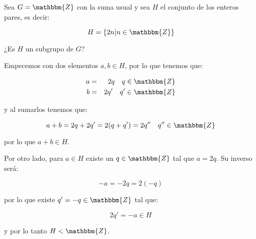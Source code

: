         \begin{ejemplo}
            Sea $G = \mathbbm{Z}$ con la suma usual y sea $H$ el conjunto de los enteros pares, es decir:

            \begin{equation*}
                H = \left\{ 2n | n \in \mathbbm{Z} \right\}
            \end{equation*}

            ¿Es $H$ un subgrupo de $G$?

            Empecemos con dos elementos $a, b \in H$, por lo que tenemos que:

            \begin{eqnarray*}
                a & = & 2 q \quad q \in \mathbbm{Z} \\
                b & = & 2 q' \quad q' \in \mathbbm{Z}
            \end{eqnarray*}

            y al sumarlos tenemos que:

            \begin{equation*}
                a + b = 2q + 2q' = 2(q + q') = 2q'' \quad q'' \in \mathbbm{Z}
            \end{equation*}

            por lo que $a + b \in H$.

            Por otro lado, para $a \in H$ existe un $q \in \mathbbm{Z}$ tal que $a = 2q$.
            Su inverso será:

            \begin{equation*}
                -a = -2 q = 2(-q)
            \end{equation*}

            por lo que existe $q' = -q \in \mathbbm{Z}$ tal que:

            \begin{equation*}
                2 q' = -a \in H
            \end{equation*}

            y por lo tanto $H < \mathbbm{Z}$.
        \end{ejemplo}

